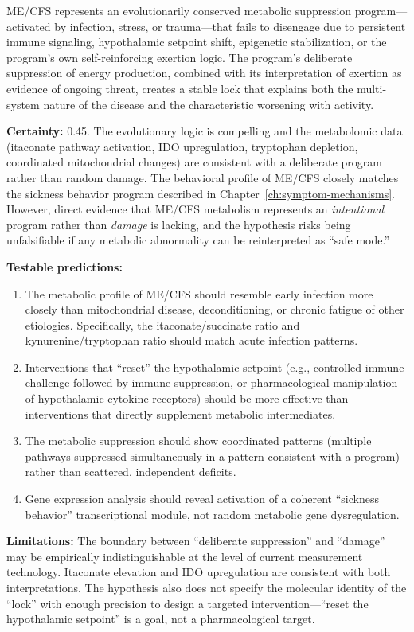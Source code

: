 \begin{hypothesis}
\label{hyp:safe-mode-root}
ME/CFS represents an evolutionarily conserved metabolic suppression program---activated by infection, stress, or trauma---that fails to disengage due to persistent immune signaling, hypothalamic setpoint shift, epigenetic stabilization, or the program's own self-reinforcing exertion logic. The program's deliberate suppression of energy production, combined with its interpretation of exertion as evidence of ongoing threat, creates a stable lock that explains both the multi-system nature of the disease and the characteristic worsening with activity.

\textbf{Certainty:} 0.45. The evolutionary logic is compelling and the metabolomic data (itaconate pathway activation, IDO upregulation, tryptophan depletion, coordinated mitochondrial changes) are consistent with a deliberate program rather than random damage. The behavioral profile of ME/CFS closely matches the sickness behavior program described in Chapter~\ref{ch:symptom-mechanisms}. However, direct evidence that ME/CFS metabolism represents an \emph{intentional} program rather than \emph{damage} is lacking, and the hypothesis risks being unfalsifiable if any metabolic abnormality can be reinterpreted as ``safe mode.''

\textbf{Testable predictions:}
\begin{enumerate}
    \item The metabolic profile of ME/CFS should resemble early infection more closely than mitochondrial disease, deconditioning, or chronic fatigue of other etiologies. Specifically, the itaconate/succinate ratio and kynurenine/tryptophan ratio should match acute infection patterns.
    \item Interventions that ``reset'' the hypothalamic setpoint (e.g., controlled immune challenge followed by immune suppression, or pharmacological manipulation of hypothalamic cytokine receptors) should be more effective than interventions that directly supplement metabolic intermediates.
    \item The metabolic suppression should show coordinated patterns (multiple pathways suppressed simultaneously in a pattern consistent with a program) rather than scattered, independent deficits.
    \item Gene expression analysis should reveal activation of a coherent ``sickness behavior'' transcriptional module, not random metabolic gene dysregulation.
\end{enumerate}

\textbf{Limitations:} The boundary between ``deliberate suppression'' and ``damage'' may be empirically indistinguishable at the level of current measurement technology. Itaconate elevation and IDO upregulation are consistent with both interpretations. The hypothesis also does not specify the molecular identity of the ``lock'' with enough precision to design a targeted intervention---``reset the hypothalamic setpoint'' is a goal, not a pharmacological target.
\end{hypothesis}


